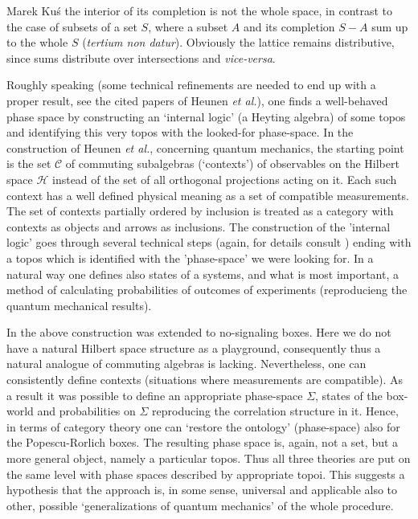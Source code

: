 \begin{artengenv}{Marek Ku\'s}
the interior of its completion is not the whole space, in contrast to the case of subsets of a set $S$, where a subset $A$ and its completion $S-A$ sum up to the whole $S$ (\textit{tertium non datur}). Obviously the lattice remains distributive, since sums distribute over intersections and \textit{vice-versa}.

Roughly speaking (some technical refinements are needed to end up with a proper result, see the cited papers of Heunen \textit{et al.}), one finds a well-behaved phase space by constructing an `internal logic' (a Heyting algebra) of some topos and identifying this very topos with the looked-for phase-space. In the construction of Heunen \textit{et al.}, concerning quantum mechanics, the starting point is the set $\mathscr{C}$ of commuting subalgebras (`contexts') of observables on the Hilbert space $\mathcal{H}$ instead of the set of all orthogonal projections acting on it. Each such context has a well defined physical meaning as a set of compatible measurements. The set of contexts partially ordered by inclusion is treated as a category with contexts as objects and arrows as inclusions. The construction of the 'internal logic' goes through several technical steps (again, for details consult \parencite{heunen_topos_2009,heunen_gelfand_2011}) ending with a topos which is identified with the  'phase-space' we were looking for. In a natural way one defines also states of a systems, and what is most important, a method of calculating probabilities of outcomes of experiments (reproducieng the quantum mechanical results).

 In \parencite{gutt_non-signalling_2016} the above construction was extended to no-signaling boxes. Here we do not have a natural Hilbert space structure as a playground, consequently thus a natural analogue of commuting algebras is lacking. Nevertheless, one can consistently define contexts (situations where measurements are compatible). As a result it was possible to define an appropriate phase-space $\Sigma$, states of the box-world and probabilities on $\Sigma$ reproducing the correlation structure in it.  Hence, in terms of category theory one can `restore the ontology' (phase-space) also for the Popescu-Rorlich boxes. The resulting phase space is, again, not a set, but a more general object, namely a particular topos. Thus all three theories are put on the same level with phase spaces described by appropriate topoi. This suggests a hypothesis that the approach is, in some sense, universal and applicable also to other, possible `generalizations of quantum mechanics' of the whole procedure.
 

\end{artengenv}
